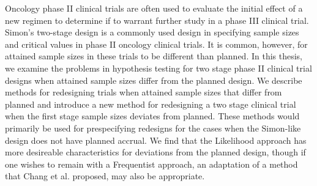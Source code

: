 \documentclass[12pt]{report}\usepackage[]{graphicx}\usepackage[]{color}
\newlength{\li}\setlength{\li}{14.48pt}
\newlength{\di}\setlength{\di}{-3.5mm}
\begin{document}
\vspace{7mm}
Oncology phase II clinical trials are often used to evaluate the initial effect of a new regimen to determine if to warrant further study in a phase III clinical trial. Simon's two-stage design is a commonly used design in specifying sample sizes and critical values in phase II oncology clinical trials. It is common, however, for attained sample sizes in these trials to be different than planned. In this thesis, we examine the problems in hypothesis testing for two stage phase II clinical trial designs when attained sample sizes differ from the planned design. We describe methods for redesigning trials when attained sample sizes that differ from planned and introduce a new method for redesigning a two stage clinical trial when the first stage sample sizes deviates from planned. These methods would primarily be used for prespecifying redesigns for the cases when the Simon-like design does not have planned accrual. We find that the Likelihood approach has more desireable characteristics for deviations from the planned design, though if one wishes to remain with a Frequentist approach, an adaptation of a method that Chang et al. proposed, may also be appropriate.  
\newpage

\normalsize
\doublespacing
{}
\setcounter{page}{1}


\end{document}
